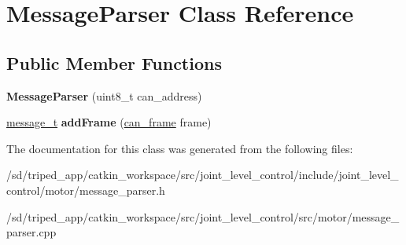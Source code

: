 \hypertarget{classMessageParser}{}\section{Message\+Parser Class Reference}
\label{classMessageParser}
\subsection*{Public Member Functions}
\begin{DoxyCompactItemize}
\item 
\mbox{\label{classMessageParser_abd504499821ba3076c3b5fcbe9709f59}} 
{\bfseries Message\+Parser} (uint8\+\_\+t can\+\_\+address)
\item 
\mbox{\label{classMessageParser_a6106b34b152ee12e88e6a00cc88cb614}} 
\hyperlink{structMessage}{message\+\_\+t} {\bfseries add\+Frame} (\hyperlink{structcan__frame}{can\+\_\+frame} frame)
\end{DoxyCompactItemize}


The documentation for this class was generated from the following files\+:\begin{DoxyCompactItemize}
\item 
/sd/triped\+\_\+app/catkin\+\_\+workspace/src/joint\+\_\+level\+\_\+control/include/joint\+\_\+level\+\_\+control/motor/message\+\_\+parser.\+h\item 
/sd/triped\+\_\+app/catkin\+\_\+workspace/src/joint\+\_\+level\+\_\+control/src/motor/message\+\_\+parser.\+cpp\end{DoxyCompactItemize}

